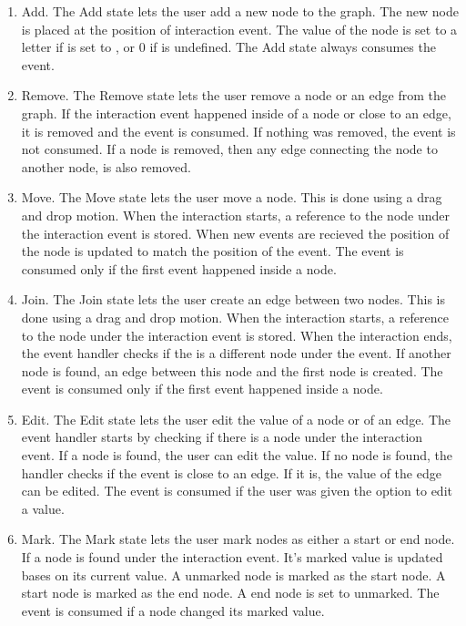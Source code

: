 \begin{enumerate}
    \item Add. The Add state lets the user add a new node to the graph. The new node is placed at the position of interaction event. The value of the node is set to a letter if  is set to , or 0 if  is undefined. The Add state always consumes the event. 
    \item Remove. The Remove state lets the user remove a node or an edge from the graph. If the interaction event happened inside of a node or close to an edge, it is removed and the event is consumed. If nothing was removed, the event is not consumed. If a node is removed, then any edge connecting the node to another node, is also removed.
    \item Move. The Move state lets the user move a node. This is done using a drag and drop motion. When the interaction starts, a reference to the node under the interaction event is stored. When new events are recieved the position of the node is updated to match the position of the event. The event is consumed only if the first event happened inside a node.
    \item Join. The Join state lets the user create an edge between two nodes. This is done using a drag and drop motion. When the interaction starts, a reference to the node under the interaction event is stored. When the interaction ends, the event handler checks if the is a different node under the event. If another node is found, an edge between this node and the first node is created. The event is consumed only if the first event happened inside a node.
    \item Edit. The Edit state lets the user edit the value of a node or of an edge. The event handler starts by checking if there is a node under the interaction event. If a node is found, the user can edit the value. If no node is found, the handler checks if the event is close to an edge. If it is, the value of the edge can be edited. The event is consumed if the user was given the option to edit a value.
    \item Mark. The Mark state lets the user mark nodes as either a start or end node. If a node is found under the interaction event. It's marked value is updated bases on its current value. A unmarked node is marked as the start node. A start node is marked as the end node. A end node is set to unmarked. The event is consumed if a node changed its marked value.
\end{enumerate}